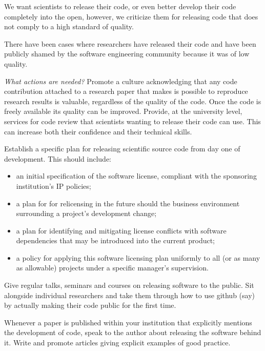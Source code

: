 \documentclass[a4paper,UKenglish]{dagman}
\begin{document}
We want scientists to release their code, or even better develop their code completely into the open, however, we criticize them for releasing code that does not comply to a high standard of quality. 

There have been cases where researchers have released their code and have been publicly shamed by the software engineering community because it was of low quality.


\emph{What actions are needed?}
Promote a culture acknowledging that any code contribution attached to a research paper that makes is possible to reproduce research results is valuable, regardless of the quality of the code. Once the code is freely available its quality can be improved.
Provide, at the university level, services for code review that scientists wanting to release their code can use. This can increase both their confidence and their technical skills. 

Establish a specific plan for releasing scientific source code from day one of development. This should include:
\begin{itemize}
\item an initial specification of the software license, compliant with the sponsoring institution's IP policies;
\item a plan for for relicensing in the future should the business environment surrounding a project's development change;
\item a plan for identifying and mitigating license conflicts with software dependencies that may be introduced into the current product;
\item a policy for applying this software licensing plan uniformly to all (or as many as allowable) projects under a specific manager's supervision. 
\end{itemize}

Give regular talks, seminars and courses on releasing software to the public. 
Sit alongside individual researchers and take them through how to use github (say) by actually making their code public for the first time.

Whenever a paper is published within your institution that explicitly mentions the development of code, speak to the author about releasing the software behind it. Write and promote articles giving explicit examples of good practice.

\end{document}

